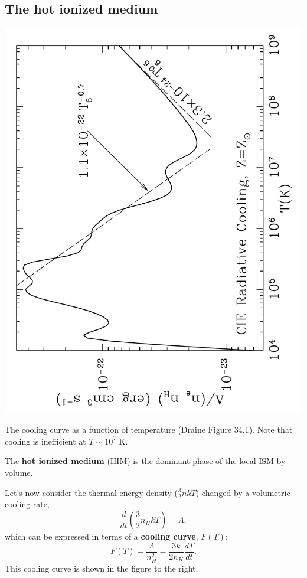 \documentclass{tufte-handout}
\renewcommand{\textbf}[1]{{\bf \textcolor{dark-gray}{#1}}}
\begin{document}
\subsection{The hot ionized medium}
\begin{marginfigure}
\includegraphics[angle=-90]{ism_figures/Draine-34_1}
\caption{The cooling curve as a function of temperature (Draine Figure 34.1). Note that cooling is inefficient at $T \sim 10^7$ K.}
\end{marginfigure}

The \textbf{hot ionized medium} (HIM) is the dominant phase of the local ISM by volume.

Let's now consider the thermal energy density ($\frac{3}{2}n k T$) changed by a volumetric cooling rate,
\[\frac{d}{dt}\left (\frac{3}{2}n_H kT\right ) = \Lambda,\]
which can be expressed in terms of a \textbf{cooling curve}, $F(T)$:
\begin{equation}
F(T) = \frac{\Lambda}{n_H^2} = \frac{3k}{2n_H}\frac{dT}{dt}.
\end{equation}
This cooling curve is shown in the figure to the right.
\end{document}
